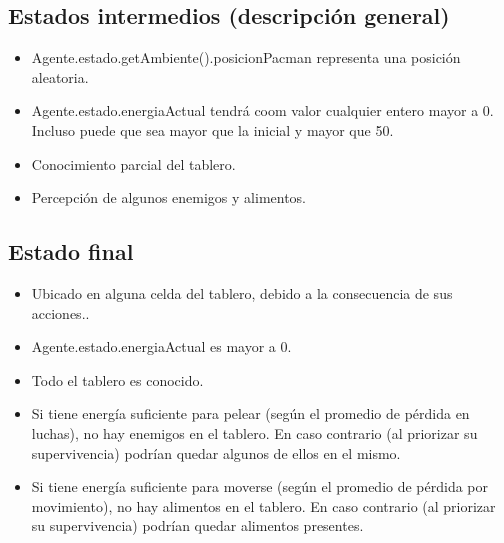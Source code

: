 \subsection{Estados intermedios (descripción general)}

\begin{itemize}
\item Agente.estado.getAmbiente().posicionPacman representa una posición
aleatoria.
\item Agente.estado.energiaActual tendrá coom valor cualquier entero mayor a 0.
Incluso puede que sea mayor que la inicial y mayor que 50.
\item Conocimiento parcial del tablero.
\item Percepción de algunos enemigos y alimentos.
\end{itemize}

\subsection{Estado final}

\begin{itemize}
\item Ubicado en alguna celda del tablero, debido a la consecuencia de sus acciones..
\item Agente.estado.energiaActual es mayor a 0.
\item Todo el tablero es conocido.
\item Si tiene energía suficiente para pelear (según el promedio de pérdida en
luchas), no hay enemigos en el tablero. En caso contrario (al priorizar su
supervivencia) podrían quedar algunos de ellos en el mismo.
\item Si tiene energía suficiente para moverse (según el promedio de pérdida
por movimiento), no hay alimentos en el tablero. En caso contrario (al
priorizar su supervivencia) podrían quedar alimentos presentes.
\end{itemize}
